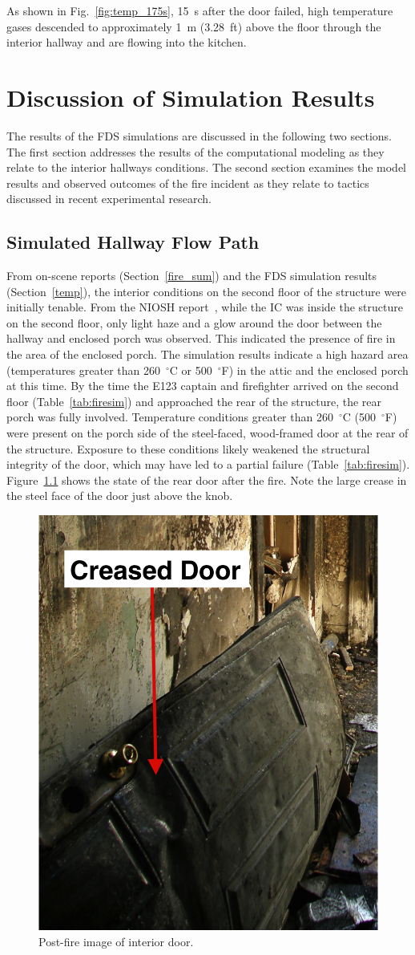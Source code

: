 \documentclass[12pt,oneside]{book}
\begin{document}
As shown in Fig.~\ref{fig:temp_175s}, 15~s after the door failed, high temperature gases descended to approximately 1~m (3.28~ft) above the floor through the interior hallway and are flowing into the kitchen.


\chapter{Discussion of Simulation Results}
\label{discussion}
The results of the FDS simulations are discussed in the following two sections. The first section addresses the results of the computational modeling as they relate to the interior hallways conditions. The second section examines the model results and observed outcomes of the fire incident as they relate to tactics discussed in recent experimental research. 

\section{Simulated Hallway Flow Path}
From on-scene reports (Section~\ref{fire_sum}) and the FDS simulation results (Section~\ref{temp}), the interior conditions on the second floor of the structure were initially tenable. From the NIOSH report~\cite{NIOSH:Bowyer}, while the IC was inside the structure on the second floor, only light haze and a glow around the door between the hallway and enclosed porch was observed. This indicated the presence of fire in the area of the enclosed porch. The simulation results indicate a high hazard area (temperatures greater than 260~$^{\circ}$C or 500~$^{\circ}$F) in the attic and the enclosed porch at this time. By the time the E123 captain and firefighter arrived on the second floor (Table~\ref{tab:firesim}) and approached the rear of the structure, the rear porch was fully involved. Temperature conditions greater than 260~$^{\circ}$C (500~$^{\circ}$F) were present on the porch side of the steel-faced, wood-framed door at the rear of the structure. Exposure to these conditions likely weakened the structural integrity of the door, which may have led to a partial failure (Table~\ref{tab:firesim}). Figure~\ref{fig:chicago_doorfold} shows the state of the rear door after the fire. Note the large crease in the steel face of the door just above the knob.

\begin{figure}[!ht]
\centering
\includegraphics[width=.4\textwidth]{../Figures/Porch_Door_1}
\caption{Post-fire image of interior door.}
\label{fig:chicago_doorfold}
\end{figure}
\end{document}
